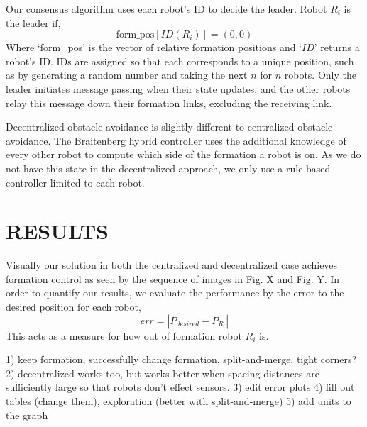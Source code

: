 \documentclass[letterpaper, 10 pt, conference]{ieeeconf}  %
\begin{document}
Our consensus algorithm uses each robot's ID to decide the leader. Robot $R_i$ is the leader if,
\[\text{form\_pos}[ID(R_i)] = (0,0)\]
Where `form\_pos' is the vector of relative formation positions and `$ID$' returns a robot's ID. IDs are assigned so that each corresponds to a unique position, such as by generating a random number and taking the next $n$ for $n$ robots. Only the leader initiates message passing when their state updates, and the other robots relay this message down their formation links, excluding the receiving link.

Decentralized obstacle avoidance is slightly different to centralized obstacle avoidance. The Braitenberg hybrid controller uses the additional knowledge of every other robot to compute which side of the formation a robot is on. As we do not have this state in the decentralized approach, we only use a rule-based controller limited to each robot.

\section{RESULTS}
Visually our solution in both the centralized and decentralized case achieves formation control as seen by the sequence of images in Fig. X and Fig. Y. In order to quantify our results, we evaluate the performance by the error to the desired position for each robot,
\[err = |P_{desired} - P_{R_i}|\]
This acts as a measure for how out of formation robot $R_i$ is.

1) keep formation, successfully change formation, split-and-merge,
tight corners?
2) decentralized works too, but works better when spacing distances are sufficiently large so that robots don't effect sensors.
3) edit error plots
4) fill out tables (change them),
exploration (better with split-and-merge)
5) add units to the graph

	
\end{document}
